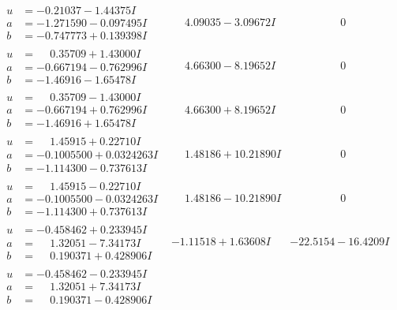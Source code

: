 \documentclass[1p]{elsarticle_modified}
\theoremstyle{definition}
\begin{document}
$$\begin{array}{c|c|c}
\begin{aligned}
u &= -0.21037 - 1.44375 I \\
a &= -1.271590 - 0.097495 I \\
b &= -0.747773 + 0.139398 I\end{aligned}
 & \phantom{-}4.09035 - 3.09672 I & \phantom{-0.000000 } 0 \\ \hline\begin{aligned}
u &= \phantom{-}0.35709 + 1.43000 I \\
a &= -0.667194 - 0.762996 I \\
b &= -1.46916 - 1.65478 I\end{aligned}
 & \phantom{-}4.66300 - 8.19652 I & \phantom{-0.000000 } 0 \\ \hline\begin{aligned}
u &= \phantom{-}0.35709 - 1.43000 I \\
a &= -0.667194 + 0.762996 I \\
b &= -1.46916 + 1.65478 I\end{aligned}
 & \phantom{-}4.66300 + 8.19652 I & \phantom{-0.000000 } 0 \\ \hline\begin{aligned}
u &= \phantom{-}1.45915 + 0.22710 I \\
a &= -0.1005500 + 0.0324263 I \\
b &= -1.114300 - 0.737613 I\end{aligned}
 & \phantom{-}1.48186 + 10.21890 I & \phantom{-0.000000 } 0 \\ \hline\begin{aligned}
u &= \phantom{-}1.45915 - 0.22710 I \\
a &= -0.1005500 - 0.0324263 I \\
b &= -1.114300 + 0.737613 I\end{aligned}
 & \phantom{-}1.48186 - 10.21890 I & \phantom{-0.000000 } 0 \\ \hline\begin{aligned}
u &= -0.458462 + 0.233945 I \\
a &= \phantom{-}1.32051 - 7.34173 I \\
b &= \phantom{-}0.190371 + 0.428906 I\end{aligned}
 & -1.11518 + 1.63608 I & -22.5154 - 16.4209 I \\ \hline\begin{aligned}
u &= -0.458462 - 0.233945 I \\
a &= \phantom{-}1.32051 + 7.34173 I \\
b &= \phantom{-}0.190371 - 0.428906 I\end{aligned}

\end{array}$$
\end{document}
